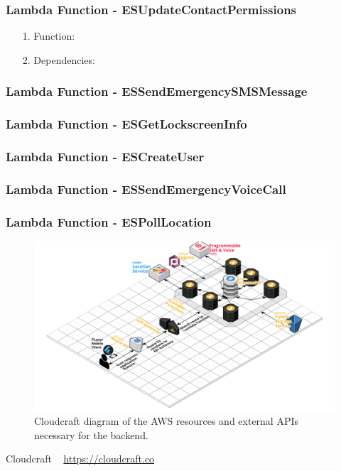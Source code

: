 \documentclass[10pt, a4paper]{article}
\begin{document}
\subsubsection{Lambda Function - ESUpdateContactPermissions}
\begin{enumerate}
	\item[1.] Function: 
	\item[2.] Dependencies: 
\end{enumerate}
\subsubsection{Lambda Function - ESSendEmergencySMSMessage }
\subsubsection{Lambda Function - ESGetLockscreenInfo }
\subsubsection{Lambda Function - ESCreateUser }
\subsubsection{Lambda Function - ESSendEmergencyVoiceCall }
\subsubsection{Lambda Function - ESPollLocation }

\begin{figure}[H]
\begin{center}
\centerline{
	\includegraphics[scale=.15]{EmergenSeek-Backend.PNG}
}
\caption{Cloudcraft \cite{one} diagram of the AWS resources and external APIs necessary for the backend.}
\label{fig:1}
\end{center}	
\end{figure}
	
\begin{thebibliography}{9}
Cloudcraft ~ \url{https://cloudcraft.co}

\end{thebibliography}
\end{document}
